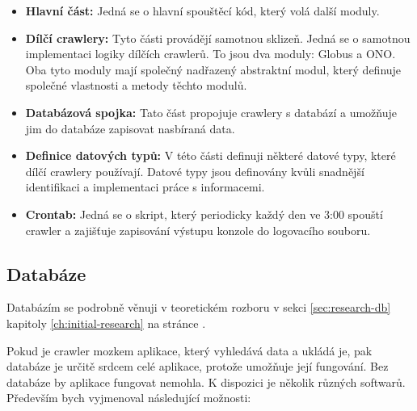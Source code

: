 \begin{itemize}
    \item \textbf{Hlavní část:} Jedná se o hlavní spouštěcí kód, který volá
        další moduly.
    \item \textbf{Dílčí crawlery:} Tyto části provádějí samotnou sklizeň.
        Jedná se o samotnou implementaci logiky dílčích crawlerů. To jsou
        dva moduly: Globus a ONO. Oba tyto moduly mají společný nadřazený
        abstraktní modul, který definuje společné vlastnosti a metody
        těchto modulů.
    \item \textbf{Databázová spojka:} Tato část propojuje crawlery s databází
        a umožňuje jim do databáze zapisovat nasbíraná data.
    \item \textbf{Definice datových typů:} V této části definuji některé
        datové typy, které dílčí crawlery používají. Datové typy jsou
        definovány kvůli snadnější identifikaci a implementaci práce
        s informacemi.
    \item \textbf{Crontab:} Jedná se o skript, který periodicky každý den
        ve 3:00 spouští crawler a zajišťuje zapisování výstupu konzole
        do logovacího souboru.
\end{itemize}

\subsection{Databáze}
\label{sec:preps-db}

Databázím se podrobně věnuji v teoretickém rozboru
v sekci \ref{sec:research-db} kapitoly \ref{ch:initial-research}
na stránce \pageref{sec:research-db}.

Pokud je crawler mozkem aplikace, který vyhledává data a ukládá je,
pak databáze je určitě srdcem celé aplikace, protože umožňuje její fungování.
Bez databáze by aplikace fungovat nemohla. K dispozici je několik různých
softwarů. Především bych vyjmenoval následující možnosti:

